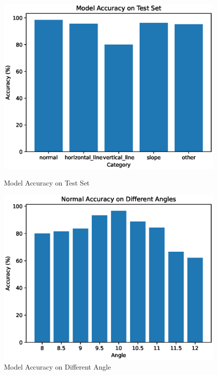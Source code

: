 \begin{figure}[htbp]
    \centering
    \begin{minipage}{0.45\textwidth}
        \centering
        \includegraphics[width=\textwidth]{./fig/assistplot/accuracy.eps}
        \caption{Model Accuracy on Test Set}
        \label{fig:accuracy_histogram}
    \end{minipage}
    \begin{minipage}{0.45\textwidth}
        \centering
        \includegraphics[width=\textwidth]{./fig/assistplot/angle_accuracy.eps}
        \caption{Model Accuracy on Different Angle}
        \label{fig:angle_accuracy_histogram}
    \end{minipage}
\end{figure}


